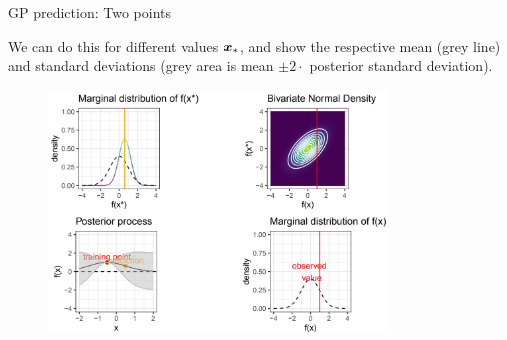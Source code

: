 \begin{frame}{GP prediction: Two points}

\begin{footnotesize}
  We can do this for different values $\bm{x}_*$, and show the respective mean (grey line) and standard deviations (grey area is mean $\pm 2 \cdot $ posterior standard deviation). 
\end{footnotesize}\vspace*{0.2cm}


\begin{figure}
  \includegraphics[width=0.8\textwidth]{figure_man/GP06.png}
\end{figure}

\end{frame}


